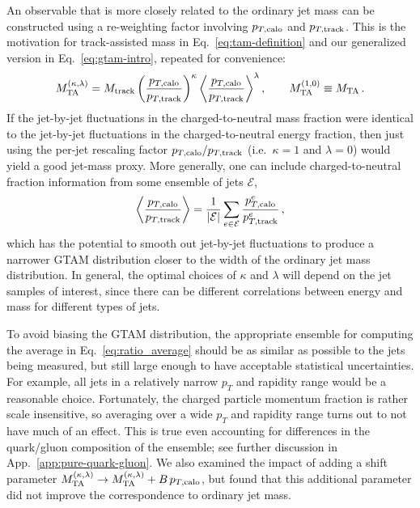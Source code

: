 \documentclass[letterpaper,11pt]{article}
\newcommand{\App}[1]{App.~\ref{#1}}
\newcommand{\Eq}[1]{Eq.~\eqref{#1}}
\begin{document}
An observable that is more closely related to the ordinary jet mass can be constructed using a re-weighting factor involving $p_{T,{\rm calo}}$ and $p_{T,{\rm track}}$. 
%
This is the motivation for track-assisted mass in \Eq{eq:tam-definition} and our generalized version in \Eq{eq:gtam-intro}, repeated for convenience:
\begin{equation}
\label{eq:tam-generalized}
M_{\rm TA}^{(\kappa,\lambda)} = M_{\rm track} \left(\frac{p_{T,\rm calo}}{p_{T,\rm track}}\right)^\kappa \bigg\langle \frac{p_{T,\rm calo}}{p_{T,\rm track}} \bigg\rangle^\lambda\,, \qquad M_{\rm TA}^{(1,0)} \equiv M_{\rm TA}\,.
\end{equation}
If the jet-by-jet fluctuations in the charged-to-neutral mass fraction were identical to the jet-by-jet fluctuations in the charged-to-neutral energy fraction, then just using the per-jet rescaling factor $p_{T,\rm calo}/p_{T,\rm track}$ (i.e.~$\kappa = 1$ and $\lambda = 0$) would yield a good jet-mass proxy.
%
More generally, one can include charged-to-neutral fraction information from some ensemble of jets $\mathcal{E}$,
\begin{equation}
\label{eq:ratio_average}
\left\langle \frac{p_{T,\rm calo}}{p_{T,\rm track}} \right\rangle = \frac{1}{\vert \mathcal{E} \vert}\sum_{e\in \mathcal{E}} \frac{p^e_{T,\rm calo}}{p^e_{T,\rm track}}\,,
\end{equation}
which has the potential to smooth out jet-by-jet fluctuations to produce a narrower GTAM distribution closer to the width of the ordinary jet mass distribution.
%
In general, the optimal choices of $\kappa$ and $\lambda$ will depend on the jet samples of interest, since there can be different correlations between energy and mass for different types of jets.


To avoid biasing the GTAM distribution, the appropriate ensemble for computing the average in \Eq{eq:ratio_average} should be as similar as possible to the jets being measured, but still large enough to have acceptable statistical uncertainties. 
%
For example, all jets in a relatively narrow $p_T$ and rapidity range would be a reasonable choice.
%
Fortunately, the charged particle momentum fraction is rather scale insensitive, so averaging over a wide $p_T$ and rapidity range turns out to not have much of an effect.
%
This is true even accounting for differences in the quark/gluon composition of the ensemble; see further discussion in \App{app:pure-quark-gluon}.
%
We also examined the impact of adding a shift parameter $M_{\rm TA}^{(\kappa,\lambda)} \rightarrow M_{\rm TA}^{(\kappa,\lambda)} + B \, p_{T,\rm calo}$, but found that this additional parameter did not improve the correspondence to ordinary jet mass. 
\end{document}
